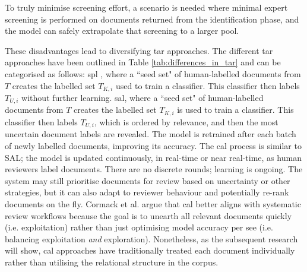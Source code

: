 \documentclass[10pt,oneside]{book}
\begin{document}
To truly minimise screening effort, a scenario is needed where minimal expert screening is performed on documents returned from the identification phase, and the model can safely extrapolate that screening to a larger pool.

These disadvantages lead to diversifying \gls*{tar} approaches. The different \gls*{tar} approaches have been outlined in Table \ref{tab:differences_in_tar} and can be categorised as follows: \gls*{spl} \cite{cohen_reducing_2006}, where a ``seed set" of human-labelled documents from $T$ creates the labelled set $T_{K,i}$ used to train a classifier. This classifier then labels $T_{U, i}$ without further learning. \gls*{sal}, where a ``seed set" of human-labelled documents from $T$ creates the labelled set $T_{K,i}$ is used to train a classifier. This classifier then labels $T_{U, i}$, which is ordered by relevance, and then the most uncertain document labels are revealed. The model is retrained after each batch of newly labelled documents, improving its accuracy. The \gls*{cal} process is similar to SAL; the model is updated continuously, in real-time or near real-time, as human reviewers label documents. There are no discrete rounds; learning is ongoing. The system may still prioritise documents for review based on uncertainty or other strategies, but it can also adapt to reviewer behaviour and potentially re-rank documents on the fly. Cormack et al. \cite{cormack_autonomy_2015} argue that \gls*{cal} better aligns with systematic review workflows because the goal is to unearth all relevant documents quickly (i.e. exploitation) rather than just optimising model accuracy per see (i.e. balancing exploitation \emph{and} exploration). Nonetheless, as the subsequent research will show, \gls*{cal} approaches have traditionally treated each document individually rather than utilising the relational structure in the corpus.
\end{document}
